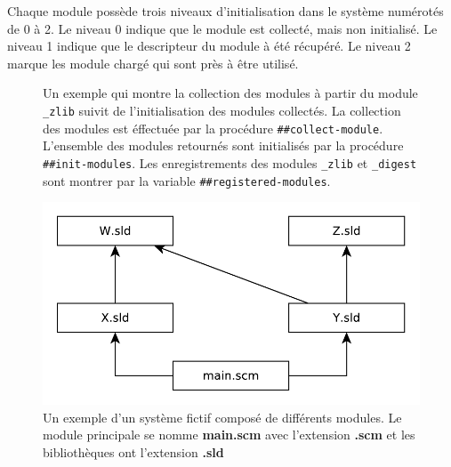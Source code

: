 Chaque module possède trois niveaux d'initialisation dans le système numérotés de
0 à 2. Le niveau 0 indique que le module est collecté, mais non initialisé. Le
niveau 1 indique que le descripteur du module à été récupéré. Le niveau 2 marque
les module chargé qui sont près à être utilisé. \\

\begin{figure}[h]
  \caption{Un exemple qui montre la collection des modules à partir du module
    \texttt{\_zlib} suivit de l'initialisation des modules collectés. La collection
    des modules est éffectuée par la procédure \texttt{\#\#collect-module}. L'ensemble
    des modules retournés sont initialisés par la procédure \texttt{\#\#init-modules}.
    Les enregistrements des modules \texttt{\_zlib} et \texttt{\_digest} sont montrer
    par la variable \texttt{\#\#registered-modules}.}
\end{figure}

\begin{figure}[ht]
  \includegraphics{figures/system-example}
  \caption{Un exemple d'un système fictif composé de différents modules.
  Le module principale se nomme \textbf{main.scm} avec l'extension \textbf{.scm}
  et les bibliothèques ont l'extension \textbf{.sld}}
  \label{fig:system-dependency-example}
\end{figure} %


